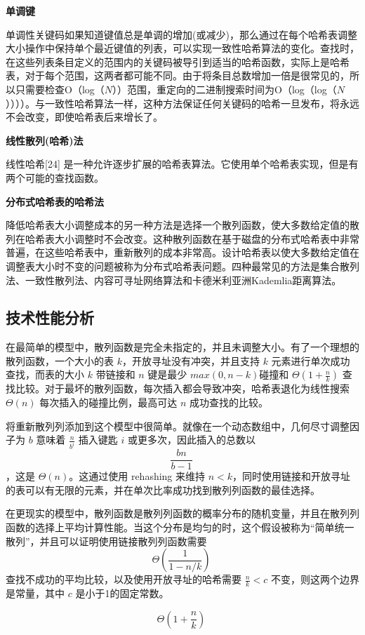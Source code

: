 \textbf{单调键}

单调性关键码如果知道键值总是单调的增加(或减少)，那么通过在每个哈希表调整大小操作中保持单个最近键值的列表，可以实现一致性哈希算法的变化。查找时，在这些列表条目定义的范围内的关键码被导引到适当的哈希函数，实际上是哈希表，对于每个范围，这两者都可能不同。由于将条目总数增加一倍是很常见的，所以只需要检查O（log（$N$））范围，重定向的二进制搜索时间为O（log（log（$N$））））。与一致性哈希算法一样，这种方法保证任何关键码的哈希一旦发布，将永远不会改变，即使哈希表后来增长了。

\textbf{线性散列(哈希)法}

线性哈希[24] 是一种允许逐步扩展的哈希表算法。它使用单个哈希表实现，但是有两个可能的查找函数。

\textbf{分布式哈希表的哈希法}

降低哈希表大小调整成本的另一种方法是选择一个散列函数，使大多数给定值的散列在哈希表大小调整时不会改变。这种散列函数在基于磁盘的分布式哈希表中非常普遍，在这些哈希表中，重新散列的成本非常高。设计哈希表以使大多数给定值在调整表大小时不变的问题被称为分布式哈希表问题。四种最常见的方法是集合散列法、一致性散列法、内容可寻址网络算法和卡德米利亚洲Kademlia距离算法。

\subsection{技术性能分析}
在最简单的模型中，散列函数是完全未指定的，并且未调整大小。有了一个理想的散列函数，一个大小的表 $k$，开放寻址没有冲突，并且支持 $k$ 元素进行单次成功查找，而表的大小 $k$ 带链接和 $n$ 键是最少 $max(0,n-k)$碰撞和 $\Theta(1+\frac{n}{k})$ 查找比较。对于最坏的散列函数，每次插入都会导致冲突，哈希表退化为线性搜索 $\Theta(n)$ 每次插入的碰撞比例，最高可达 $n$ 成功查找的比较。

将重新散列列添加到这个模型中很简单。就像在一个动态数组中，几何尽寸调整因子为 $b$ 意味着 $\frac{n}{b^i}$ 插入键匙 $i$ 或更多次，因此插入的总数以 $$\frac{bn}{b-1}~$$ ，这是 $\Theta(n)$。这通过使用 rehashing 来维持 $n<k$，同时使用链接和开放寻址的表可以有无限的元素，并在单次比率成功找到散列列函数的最佳选择。

在更现实的模型中，散列函数是散列列函数的概率分布的随机变量，并且在散列列函数的选择上平均计算性能。当这个分布是均匀的时，这个假设被称为“简单统一散列”，并且可以证明使用链接散列列函数需要 $$\Theta(\frac{1}{1-n/k})~$$ 查找不成功的平均比较，以及使用开放寻址的哈希需要 $\frac{n}{k}<c$ 不变，则这两个边界是常量，其中 $c$ 是小于1的固定常数。

$$\Theta(1+\frac{n}{k})~$$


